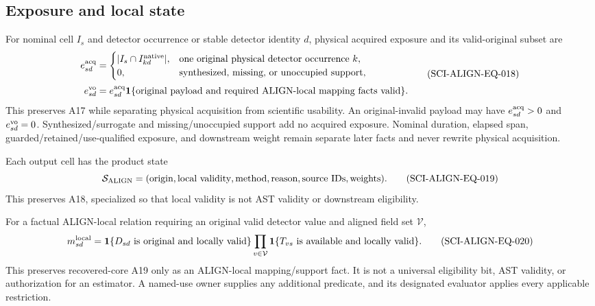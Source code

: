 \subsection{Exposure and local state}

For nominal cell \(I_s\) and detector occurrence or stable detector identity
\(d\), physical acquired exposure and its valid-original subset are
\begin{equation}
 \begin{aligned}
 e^{\rm acq}_{sd}&=\begin{cases}
 |I_s\cap I^{\rm native}_{kd}|,
   &\text{one original physical detector occurrence }k,\\
 0,&\text{synthesized, missing, or unoccupied support,}
 \end{cases}\\[2pt]
 e^{\rm vo}_{sd}&=e^{\rm acq}_{sd}
 \mathbf 1\{\text{original payload and required ALIGN-local mapping facts valid}\}.
 \end{aligned}
 \tag{SCI-ALIGN-EQ-018}\label{eq:exposure}
\end{equation}
\noindent This preserves A17 while separating physical acquisition from
scientific usability.  An original-invalid payload may have
\(e^{\rm acq}_{sd}>0\) and \(e^{\rm vo}_{sd}=0\).  Synthesized/surrogate and
missing/unoccupied support add no acquired exposure.  Nominal duration,
elapsed span, guarded/retained/use-qualified exposure, and downstream weight
remain separate later facts and never rewrite physical acquisition.

Each output cell has the product state
\begin{equation}
 \mathcal S_{\rm ALIGN}=(\text{origin},\text{local validity},\text{method},\text{reason},
 \text{source IDs},\text{weights}).
 \tag{SCI-ALIGN-EQ-019}\label{eq:quality}
\end{equation}
\noindent This preserves A18, specialized so that local validity is not AST
validity or downstream eligibility.

For a factual ALIGN-local relation requiring an original valid detector value
and aligned field set \(\mathcal V\),
\begin{equation}
 m_{sd}^{\rm local}=
 \mathbf 1\{D_{sd}\text{ is original and locally valid}\}
 \prod_{v\in\mathcal V}
 \mathbf 1\{T_{vs}\text{ is available and locally valid}\}.
 \tag{SCI-ALIGN-EQ-020}\label{eq:local-support}
\end{equation}
\noindent This preserves recovered-core A19 only as an ALIGN-local
mapping/support fact.  It is not a universal eligibility bit, AST validity,
or authorization for an estimator.  A named-use owner supplies any additional
predicate, and its designated evaluator applies every applicable restriction.
